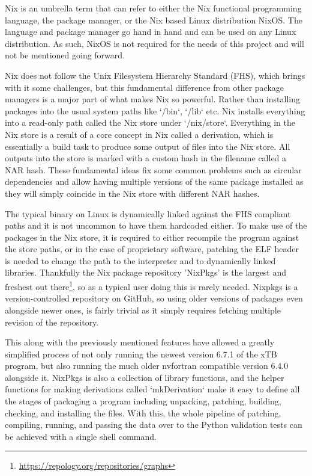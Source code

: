 Nix is an umbrella term that can refer to either the Nix functional programming language, the package manager, or the Nix based Linux distribution NixOS. The language and package manager go hand in hand and can be used on any Linux distribution. As such, NixOS is not required for the needs of this project and will not be mentioned going forward.

Nix does not follow the Unix Filesystem Hierarchy Standard (FHS), which brings with it some challenges, but this fundamental difference from other package managers is a major part of what makes Nix so powerful.
Rather than installing packages into the usual system paths like `/bin`, `/lib` etc. Nix installs everything into a read-only path called the Nix store under `/nix/store`.
Everything in the Nix store is a result of a core concept in Nix called a derivation, which is essentially a build task to produce some output of files into the Nix store.
All outputs into the store is marked with a custom hash in the filename called a NAR hash. These fundamental ideas fix some common problems such as circular dependencies and allow having multiple versions of the same package installed as they will simply coincide in the Nix store with different NAR hashes.

The typical binary on Linux is dynamically linked against the FHS compliant paths and it is not uncommon to have them hardcoded either. To make use of the packages in the Nix store, it is required to either recompile the program against the store paths, or in the case of proprietary software, patching the ELF header is needed to change the path to the interpreter and to dynamically linked libraries. Thankfully the Nix package repository 'NixPkgs' is the largest and freshest out there\footnote{\url{https://repology.org/repositories/graphs}}, so as a typical user doing this is rarely needed.
Nixpkgs is a version-controlled repository on GitHub, so using older versions of packages even alongside newer ones, is fairly trivial as it simply requires fetching multiple revision of the repository.

This along with the previously mentioned features have allowed a greatly simplified process of not only running the newest version 6.7.1 of the xTB program, but also running the much older nvfortran compatible version 6.4.0 alongside it.
NixPkgs is also a collection of library functions, and the helper functions for making derivations called `mkDerivation` make it easy to define all the stages of packaging a program including unpacking, patching, building, checking, and installing the files.
With this, the whole pipeline of patching, compiling, running, and passing the data over to the Python validation tests can be achieved with a single shell command.

